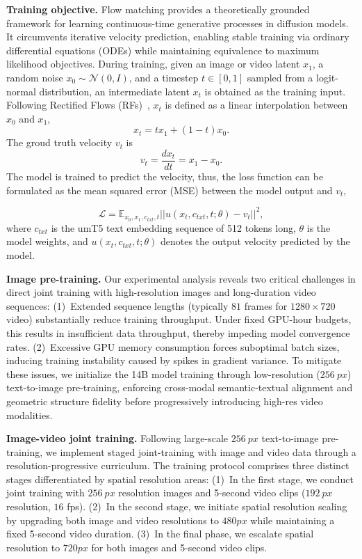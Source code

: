\noindent\textbf{Training objective.}
Flow matching provides a theoretically grounded framework for learning continuous-time generative processes in diffusion models. 
It circumvents iterative velocity prediction, enabling stable training via ordinary differential equations (ODEs) while maintaining equivalence to maximum likelihood objectives.
During training, given an image or video latent $x_{1}$, a random noise $x_{0} \sim \mathcal{N}(0, I)$, and a timestep $t \in[0,1]$ sampled from a logit-normal distribution, an intermediate latent $x_{t}$ is obtained as the training input.
Following Rectified Flows (RFs)~\citep{esser2024sd3}, $x_{t}$ is defined as a linear interpolation between $x_{0}$ and $x_{1}$, \ie
\begin{equation}\label{x_t}
    x_{t}=t x_{1}+(1-t) x_{0}.
\end{equation}
The groud truth velocity $v_{t}$ is
\begin{equation}\label{v_t}
v_{t}=\frac{d x_{t}}{d t}=x_{1}-x_{0}.
\end{equation}
The model is trained to predict the velocity, thus, the loss function can be formulated as the mean squared error (MSE) between the model output and $v_{t}$,

\begin{equation}\label{rf_loss}
\mathcal{L} = \mathbb{E}_{x_0, x_1, c_{txt}, t}||u(x_t, c_{txt}, t; \theta)-v_t||^2,
\end{equation}
where $c_{txt}$ is the umT5 text embedding sequence of 512 tokens long, $\theta$ is the model weights, and $u(x_t, c_{txt}, t; \theta)$ denotes the output velocity predicted by the model.


\noindent\textbf{Image pre-training.}
Our experimental analysis reveals two critical challenges in direct joint training with high-resolution images and long-duration video sequences: 
(1)~Extended sequence lengths (typically $81$ frames for $1280\times720$ video) substantially reduce training throughput. Under fixed GPU-hour budgets, this results in insufficient data throughput, thereby impeding model convergence rates. 
(2)~Excessive GPU memory consumption forces suboptimal batch sizes, inducing training instability caused by spikes in gradient variance.
To mitigate these issues, we initialize the 14B model training through low-resolution ($256~px$) text-to-image pre-training, enforcing cross-modal semantic-textual alignment and geometric structure fidelity before progressively introducing high-res video modalities.

\noindent\textbf{Image-video joint training.}
Following large-scale $256~px$ text-to-image pre-training, we implement staged joint-training with image and video data through a resolution-progressive curriculum. 
The training protocol comprises three distinct stages differentiated by spatial resolution areas:
(1)~In the first stage, we conduct joint training with $256~px$ resolution images and 5-second video clips ($192~px$ resolution, $16$ fps).
(2)~In the second stage, we initiate spatial resolution scaling by upgrading both image and video resolutions to $480px$ while maintaining a fixed 5-second video duration.
(3)~In the final phase, we escalate spatial resolution to $720 px$ for both images and 5-second video clips.

